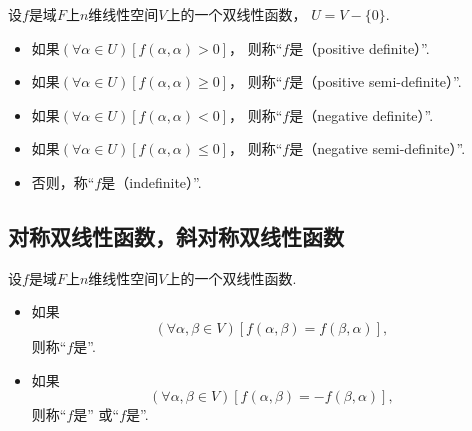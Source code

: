 \begin{definition}
设\(f\)是域\(F\)上\(n\)维线性空间\(V\)上的一个双线性函数，
\(U = V-\{0\}\).
\begin{itemize}
	\item 如果\(
		(\forall \alpha \in U)
		[f(\alpha,\alpha) > 0]
	\)，
	则称“\(f\)是（positive definite）”.

	\item 如果\(
		(\forall \alpha \in U)
		[f(\alpha,\alpha) \geq 0]
	\)，
	则称“\(f\)是（positive semi-definite）”.

	\item 如果\(
		(\forall \alpha \in U)
		[f(\alpha,\alpha) < 0]
	\)，
	则称“\(f\)是（negative definite）”.

	\item 如果\(
		(\forall \alpha \in U)
		[f(\alpha,\alpha) \leq 0]
	\)，
	则称“\(f\)是（negative semi-definite）”.

	\item 否则，称“\(f\)是（indefinite）”.
\end{itemize}
\end{definition}

\subsection{对称双线性函数，斜对称双线性函数}
\begin{definition}
设\(f\)是域\(F\)上\(n\)维线性空间\(V\)上的一个双线性函数.
\begin{itemize}
	\item 如果\begin{equation}
		(\forall \alpha,\beta \in V)
		[f(\alpha,\beta) = f(\beta,\alpha)],
	\end{equation}
	则称“\(f\)是”.
	\item 如果\begin{equation}
		(\forall \alpha,\beta \in V)
		[f(\alpha,\beta) = -f(\beta,\alpha)],
	\end{equation}
	则称“\(f\)是”
	或“\(f\)是”.
\end{itemize}
\end{definition}

